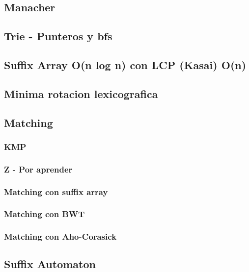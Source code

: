 \subsection{Manacher}



\subsection{Trie - Punteros y bfs}
\subsection{Suffix Array O(n log n) con LCP (Kasai) O(n)}

\subsection{Minima rotacion lexicografica}

\subsection{Matching}
\subsubsection{KMP}

\subsubsection{Z - Por aprender}

\subsubsection{Matching con suffix array}

\subsubsection{Matching con BWT}

\subsubsection{Matching con Aho-Corasick}
\subsection{Suffix Automaton}

